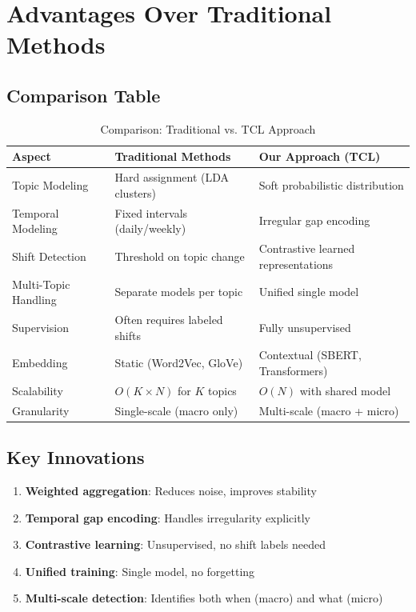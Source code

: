 \documentclass[12pt]{article}
\begin{document}
\newpage

\section{Advantages Over Traditional Methods}

\subsection{Comparison Table}

\begin{table}[H]
\centering
\small
\begin{tabular}{p{3cm}p{5cm}p{5cm}}
\toprule
\textbf{Aspect} & \textbf{Traditional Methods} & \textbf{Our Approach (TCL)} \\
\midrule
Topic Modeling & Hard assignment (LDA clusters) & Soft probabilistic distribution \\
\midrule
Temporal Modeling & Fixed intervals (daily/weekly) & Irregular gap encoding \\
\midrule
Shift Detection & Threshold on topic change & Contrastive learned representations \\
\midrule
Multi-Topic Handling & Separate models per topic & Unified single model \\
\midrule
Supervision & Often requires labeled shifts & Fully unsupervised \\
\midrule
Embedding & Static (Word2Vec, GloVe) & Contextual (SBERT, Transformers) \\
\midrule
Scalability & $O(K \times N)$ for $K$ topics & $O(N)$ with shared model \\
\midrule
Granularity & Single-scale (macro only) & Multi-scale (macro + micro) \\
\bottomrule
\end{tabular}
\caption{Comparison: Traditional vs. TCL Approach}
\end{table}

\subsection{Key Innovations}

\begin{enumerate}
    \item \textbf{Weighted aggregation}: Reduces noise, improves stability
    \item \textbf{Temporal gap encoding}: Handles irregularity explicitly
    \item \textbf{Contrastive learning}: Unsupervised, no shift labels needed
    \item \textbf{Unified training}: Single model, no forgetting
    \item \textbf{Multi-scale detection}: Identifies both when (macro) and what (micro)
\end{enumerate}
\end{document}
